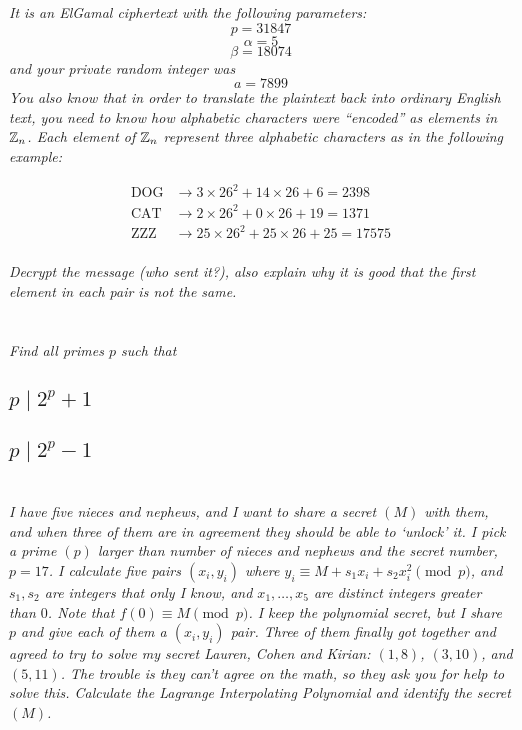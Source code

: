 \documentclass[12pt]{article}
\begin{document}
\textit{It is an ElGamal ciphertext with the following parameters:}
    $$p = 31847$$
    $$\alpha = 5$$
    $$\beta = 18074$$
\textit{and your private random integer was}
    $$a = 7899$$
\textit{You also know that in order to translate the plaintext back into ordinary English text, you need to know how alphabetic characters were ``encoded'' as elements in $\mathbb{Z}_n$.  Each element of $\mathbb{Z}_n$ represent three alphabetic characters as in the following example:}

    \begin{align*}
        \text{DOG} &\to 3 \times 26^2 + 14 \times 26 + 6 = 2398\\
        \text{CAT} &\to 2 \times 26^2 + 0 \times 26 + 19 = 1371\\
        \text{ZZZ} &\to 25 \times 26^2 + 25 \times 26 + 25 = 17575\\
    \end{align*}

\textit{Decrypt the message (who sent it?), also explain why it is good that the first element in each pair is not the same.}

\section{} \textit{Find all primes $p$ such that}

    \subsection{$p \mid 2^p + 1$}

    \subsection{$p \mid 2^p - 1$}

\section{} \textit{I have five nieces and nephews, and I want to share a secret $(M)$ with them, and when three of them are in agreement they should be able to `unlock' it. I pick a prime $(p)$ larger than number of nieces and nephews and the secret number, $p = 17$. I calculate five pairs $(x_i, y_i)$ where $y_i \equiv M + s_1 x_i + s_2 x_i ^ 2\pmod{p}$, and $s_1, s_2$ are integers that only I know, and $x_1, \dots, x_5$ are distinct integers greater than $0$. Note that $f(0) \equiv M \pmod{p}$. I keep the polynomial secret, but I share $p$ and give each of them a $(x_i, y_i)$ pair. Three of them finally got together and agreed to try to solve my secret Lauren, Cohen and Kirian: $(1, 8)$, $(3, 10)$, and $(5, 11)$. The trouble is they can't agree on the math, so they ask you for help to solve this. Calculate the Lagrange Interpolating Polynomial and identify the secret $(M)$.}
\end{document}
